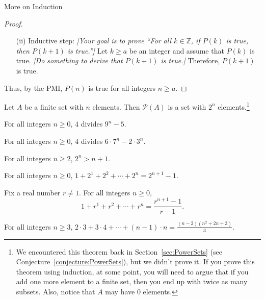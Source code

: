 \begin{section}{More on Induction}
\begin{skeleton}
\begin{center}
{\begin{minipage}{6in}
\begin{proof}
\begin{enumerate}
\item[(ii)] Inductive step:  \emph{[Your goal is to prove ``For all $k\in\mathbb{Z}$, if $P(k)$ is true, then $P(k+1)$ is true.'']} Let $k \ge a$ be an integer and assume that $P(k)$ is true. \emph{[Do something to derive that $P(k+1)$ is true.]} Therefore, $P(k+1)$ is true.
\end{enumerate}
Thus, by the PMI, $P(n)$ is true for all integers $n \ge a$.
\end{proof}
\end{minipage}
}
\end{center}
\end{skeleton}

\begin{theorem}
Let $A$ be a finite set with $n$ elements.  Then $\mathcal{P}(A)$ is a set with $2^{n}$ elements.\footnote{We encountered this theorem back in Section~\ref{sec:PowerSets} (see Conjecture~\ref{conjecture:PowerSets}), but we didn't prove it. If you prove this theorem using induction, at some point, you will need to argue that if you add one more element to a finite set, then you end up with twice as many subsets. Also, notice that $A$ may have 0 elements.}
\end{theorem}

\begin{theorem}
For all integers $n \ge 0$, $4$ divides $9^n - 5$.
\end{theorem}

\begin{theorem}
For all integers $n \ge 0$, $4$ divides $6\cdot 7^n - 2 \cdot 3^n$.
\end{theorem}

\begin{theorem}
For all integers $n \ge 2$, $2^n > n + 1$.
\end{theorem}

\begin{theorem}
For all integers $n \ge 0$, $1 + 2^1 + 2^2 + \cdots + 2^n = 2^{n+1} - 1$.
\end{theorem}

\begin{theorem}
Fix a real number $r \neq 1$. For all integers $n \ge 0$,
$$\displaystyle{1 + r^1 + r^2 + \cdots + r^n = \frac{r^{n+1} - 1}{r-1}}.$$
\end{theorem}

\begin{theorem}
For all integers $n \ge 3$, $\displaystyle{2\cdot 3 + 3 \cdot 4 + \cdots + (n-1)\cdot n = \frac{(n-2)(n^2+2n+3)}{3}}$.
\end{theorem}


\end{section}
